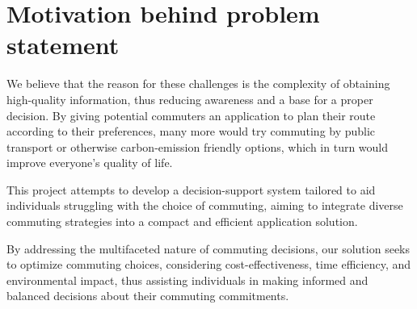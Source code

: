 \section{Motivation behind problem statement}\label{sec:motivation-behind-problem-statement}

We believe that the reason for these challenges is the complexity of obtaining high-quality information, thus reducing
awareness and a base for a proper decision.
By giving potential commuters an application to plan their route according to their preferences, many more would try
commuting by public transport or otherwise carbon-emission friendly options, which in turn would improve everyone's
quality of life.

This project attempts to develop a decision-support system tailored to aid individuals struggling with the choice of
commuting, aiming to integrate diverse commuting strategies into a compact and efficient application solution.

By addressing the multifaceted nature of commuting decisions, our solution seeks to optimize commuting choices,
considering cost-effectiveness, time efficiency, and environmental impact, thus assisting individuals in making
informed and balanced decisions about their commuting commitments.

